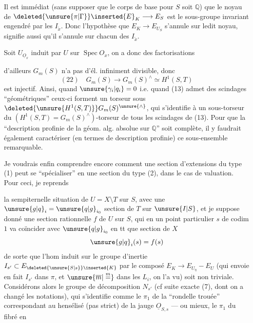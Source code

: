 Il est immédiat (sans supposer que le corps de base pour $S$ soit $\mathbb Q$) que le noyau de $\deleted{\unsure{\pi|\Gamma}}\inserted{E}_K\longrightarrow E_S$ est le sous-groupe invariant engendré par les $I_{\widetilde x}$. Donc l'hypothèse que $E_K\longrightarrow E_{U_S}$ s'annule sur ledit noyau, signifie aussi qu'il s'annule sur chacun des $I_{\widetilde x}$.

Soit  $U_{\underline O_x}$ induit par $U$ sur $\operatorname{Spec}O_x$, on a donc des factorisations

d'ailleurs $G_m(S)$ n'a pas d'él. infiniment divisible, donc
\[
(22)\quad G_m(S)\longrightarrow G_m(S)^\wedge\simeq H^1(S,T)
\]
est injectif. Ainsi, quand $\unsure{\gamma_i|q_i}=0$ i.e. quand (13) admet des scindages ``géométriques''  ceux-ci forment un torseur sous $\deleted{\unsure{H^1(S,T)}}G_m(S)^{\unsure{\wedge}}$, qui s'identifie à un sous-torseur du $(H^1(S,T)=G_m(S)^\wedge)$-torseur de tous les scindages de (13). Pour que la ``description profinie de la géom. alg. absolue sur $\mathbb Q$'' soit complète, il y faudrait également caractériser (en termes de  description profinie) ce sous-ensemble remarquable.

Je voudrais enfin comprendre encore comment une section d'extensions du type (1) peut se ``spécialiser'' en une section du type (2), dans le cas de  valuation. Pour ceci, je reprends

la sempiternelle situation de $U=X\setminus T$ sur $S$, avec une $\unsure{g|q}_i=\unsure{q|g}_{i_0}$ section de $T$ sur $\unsure{I|S}$, et je suppose donné une section rationnelle $f$ de $U$ sur $S$, qui en un point particulier $s$ de  codim $1$ va coïncider avec $\unsure{q|g}_{i_0}$ en tt que section de $X$
\[
\unsure{g|q}_i(s)=f(s)
\]
de sorte que l'hom induit sur le groupe d'inertie $I_{s'}\subset E_{\deleted{\unsure{S|s}}\inserted{K}}$ par le composé $E_K\longrightarrow E_{U_\eta}-E_U$ (qui envoie en fait $I_{s'}$ dans $\pi$, et $\unsure{\overline m|\overset{m}{=}}$ dans les $L_i$, on l'a vu) soit non  triviale. Considérons alors le groupe de décomposition $N_{s'}$ (cf suite exacte (7), dont on a changé les notations), qui s'identifie comme le $\pi_1$ de la ``rondelle trouée'' correspondant au hensélisé (pas strict) de la jauge $\underline O_{S,s}$ --- ou mieux, le $\pi_1$ du fibré en

